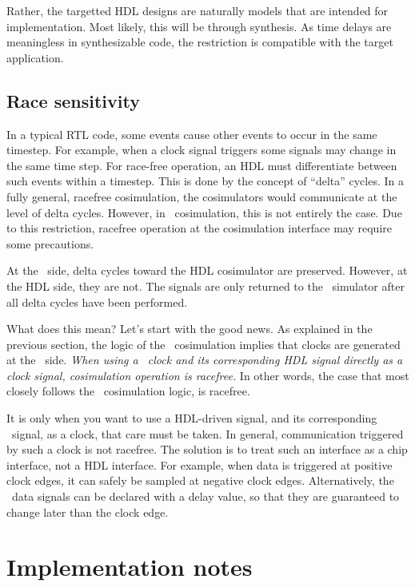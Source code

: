 Rather, the targetted HDL designs are naturally models that are
intended for implementation.  Most likely, this will be through
synthesis. As time delays are meaningless in synthesizable code, the
restriction is compatible with the target application.

\subsection{Race sensitivity}

In a typical RTL code, some events cause other events to occur in the
same timestep. For example, when a clock signal triggers some signals
may change in the same time step. For race-free operation, an HDL
must differentiate between such events within a timestep. This is done
by the concept of ``delta'' cycles. In a fully general, racefree
cosimulation, the cosimulators would communicate at the level of delta
cycles. However, in \myhdl\ cosimulation, this is not entirely the
case.  Due to this restriction, racefree operation at the cosimulation
interface may require some precautions.

At the \myhdl\ side, delta cycles toward the HDL cosimulator are
preserved. However, at the HDL side, they are not. The signals are
only returned to the \myhdl\ simulator after all delta cycles have
been performed.

What does this mean? Let's start with the good news. As explained in
the previous section, the logic of the \myhdl\ cosimulation implies
that clocks are generated at the \myhdl\ side.  \emph{When using a
\myhdl\ clock and its corresponding HDL signal directly as a clock
signal, cosimulation operation is racefree.} In other words, the case
that most closely follows the \myhdl\ cosimulation logic, is racefree.

It is only when you want to use a HDL-driven signal, and its
corresponding \myhdl\ signal, as a clock, that care must be taken. In
general, communication triggered by such a clock is not racefree. The
solution is to treat such an interface as a chip interface, not a HDL
interface.  For example, when data is triggered at positive clock
edges, it can safely be sampled at negative clock edges.
Alternatively, the \myhdl\ data signals can be declared with a delay
value, so that they are guaranteed to change later than the clock
edge.


\section{Implementation notes}





 

